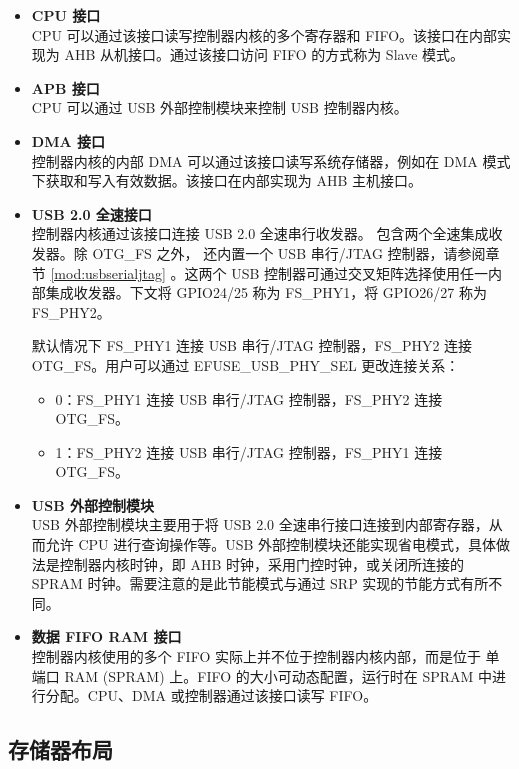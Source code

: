 \documentclass[main\_\_CN.tex]{subfiles}
\begin{document}
\begin{itemize}
    \item {\bfseries CPU 接口}\\
   CPU 可以通过该接口读写控制器内核的多个寄存器和 FIFO。该接口在内部实现为 AHB 从机接口。通过该接口访问 FIFO 的方式称为 Slave 模式。

   \item {\bfseries APB 接口}\\
    CPU 可以通过 USB 外部控制模块来控制 USB 控制器内核。

    \item {\bfseries DMA 接口}\\
    控制器内核的内部 DMA 可以通过该接口读写系统存储器，例如在 DMA 模式下获取和写入有效数据。该接口在内部实现为 AHB 主机接口。

    \item {\bfseries USB 2.0 全速接口}\\
   控制器内核通过该接口连接 USB 2.0 全速串行收发器。\chipname{} 包含两个全速集成收发器。除 OTG\_FS 之外，\chipname{} 还内置一个 USB 串行/JTAG 控制器，请参阅章节 \ref{mod:usbserialjtag} \textit{}。这两个 USB 控制器可通过交叉矩阵选择使用任一内部集成收发器。下文将 GPIO24/25 称为 FS\_PHY1，将 GPIO26/27 称为 FS\_PHY2。

默认情况下 FS\_PHY1 连接 USB 串行/JTAG 控制器，FS\_PHY2 连接 OTG\_FS。用户可以通过 EFUSE\_USB\_PHY\_SEL 更改连接关系：
\begin{itemize}
    \item 0：FS\_PHY1 连接 USB 串行/JTAG 控制器，FS\_PHY2 连接 OTG\_FS。
    \item 1：FS\_PHY2 连接 USB 串行/JTAG 控制器，FS\_PHY1 连接 OTG\_FS。
\end{itemize}
    \item {\bfseries USB 外部控制模块}\\
    USB 外部控制模块主要用于将 USB 2.0 全速串行接口连接到内部寄存器，从而允许 CPU 进行查询操作等。USB 外部控制模块还能实现省电模式，具体做法是控制器内核时钟，即 AHB 时钟，采用门控时钟，或关闭所连接的 SPRAM 时钟。需要注意的是此节能模式与通过 SRP 实现的节能方式有所不同。
    \item {\bfseries 数据 FIFO RAM 接口}\\
    控制器内核使用的多个 FIFO 实际上并不位于控制器内核内部，而是位于 单端口 RAM (SPRAM) 上。FIFO 的大小可动态配置，运行时在 SPRAM 中进行分配。CPU、DMA 或控制器通过该接口读写 FIFO。
\end{itemize}

\subsection{存储器布局}
\end{document}
